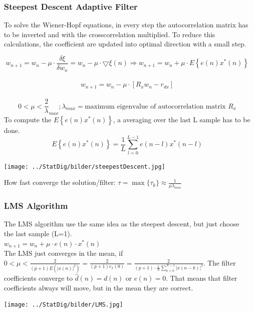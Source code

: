 \subsubsection{Steepest Descent Adaptive Filter }
To solve the Wiener-Hopf equations, in every step the autocorrelation matrix has to be inverted and with the crosscorrelation multiplied. 
To reduce this calculations, the coefficient are updated into optimal direction with a small step.
\begin{minipage}{13cm}
$$w_{n+1}=w_n-\mu \cdot  \dfrac{\delta \xi}{\delta w_n} =w_n-\mu \cdot \bigtriangledown\xi(n) \Rightarrow \boxed{ w_{n+1}= w_n+\mu \cdot E\left\lbrace e(n)x^*(n)\right\rbrace}$$ \\
																											$$ \boxed{	w_{n+1}= w_n - \mu \cdot [R_x w_n - r_{dx} ]   }$$ \\
$$ 0<\mu< \frac 2 \lambda_{max}; \lambda_{max} = \text{maximum eigenvalue of autocorrelation matrix } R_x$$
To compute the $E\left\lbrace e(n)x^*(n)\right\rbrace$, a averaging over the last L sample has to be done.  
$$E\left\lbrace e(n)x^*(n)\right\rbrace= \frac{1}{L}\sum\limits_{l=0}^{L-1}e(n-l)x^*(n-l)$$
\end{minipage}
\begin{minipage}{6cm}
        \texttt{[image: ../StatDig/bilder/steepestDescent.jpg]}
\end{minipage}

 How fast converge the solution/filter: $\displaystyle \tau=\max\{\tau_k\}\approx\frac{1}{\mu \lambda_{min}} $


\clearpage
\subsubsection{LMS Algorithm }
\begin{minipage}{14cm}

  The LMS algorithm use the same idea as the steepest descent, but just choose the last sample (L=1).\\
  $\boxed{ w_{n+1}=w_n+\mu \cdot e(n) \cdot x^*(n) }$\\
  
  The LMS just converges in the mean, if $\displaystyle 0<\mu< \frac{2}{(p+1)E\left(|x(n)|^2\right)}=\frac{2}{(p+1)r_x(0)}=\frac{2}{(p+1) \cdot \frac{1}{N} \sum\limits_{k=0}^{N-1}|x(n-k)|^2}$.
  The filter coefficients converge to $\hat d(n) = d(n)$ or $e(n) = 0$. 
  That means that filter coefficients always will move, but in the mean they are correct.
\end{minipage}
\begin{minipage}{5cm}
  \texttt{[image: ../StatDig/bilder/LMS.jpg]}
\end{minipage}


